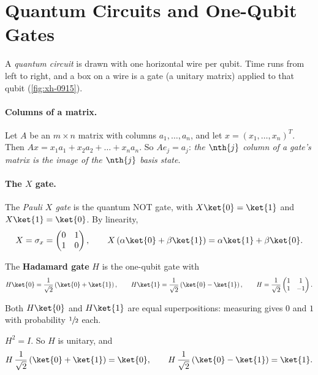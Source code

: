 \section{Quantum Circuits and One-Qubit Gates}

A \emph{quantum circuit} is drawn with one horizontal wire per qubit. Time runs from left to right,
and a box on a wire is a gate (a unitary matrix) applied to that qubit (\cref{fig:xh-0915}).

\paragraph{Columns of a matrix.} Let $A$ be an $m \times n$ matrix with columns $a_1, \dots, a_n$,
and let $x = (x_1, \dots, x_n)^T$. Then $A x = x_1 a_1 + x_2 a_2 + \dots + x_n a_n$. So
$A e_j = a_j$: \emph{the $\nth{j}$ column of a gate's matrix is the image of the $\nth{j}$ basis
state}.

\paragraph{The $X$ gate.} The \emph{Pauli $X$ gate} is the quantum NOT gate, with
$X \ket{0} = \ket{1}$ and $X \ket{1} = \ket{0}$. By linearity,
\[X = \sigma_x = \begin{pmatrix} 0 & 1 \\ 1 & 0 \end{pmatrix},
    \qquad
    X \left(\alpha \ket{0} + \beta \ket{1}\right) = \alpha \ket{1} + \beta \ket{0}.\]

\begin{definition}\label{def:hadamard-0915}
    The \textbf{Hadamard gate} $H$ is the one-qubit gate with
    \begin{equation}\label{eq:hadamard-0915}
        H \ket{0} = \frac{1}{\sqrt{2}}\left(\ket{0} + \ket{1}\right),
        \qquad
        H \ket{1} = \frac{1}{\sqrt{2}}\left(\ket{0} - \ket{1}\right),
        \qquad
        H = \frac{1}{\sqrt{2}} \begin{pmatrix} 1 & 1 \\ 1 & -1 \end{pmatrix}.
    \end{equation}
\end{definition}

Both $H \ket{0}$ and $H \ket{1}$ are equal superpositions: measuring gives $0$ and $1$ with
probability $\sfrac{1}{2}$ each.

\begin{lemma}\label{lem:hh-0915}
    $H^2 = I$. So $H$ is unitary, and
    \[H \, \frac{1}{\sqrt{2}}\left(\ket{0} + \ket{1}\right) = \ket{0},
        \qquad
        H \, \frac{1}{\sqrt{2}}\left(\ket{0} - \ket{1}\right) = \ket{1}.\]
\end{lemma}

